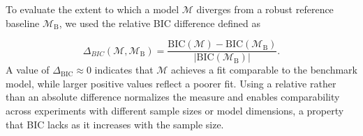 \documentclass[preprint,12pt]{elsarticle}
\newcommand{\blue}{\color{blue}}
\begin{document}


To evaluate the extent to which a model $\mathcal{M}$ diverges from a robust reference baseline $\mathcal{M}_{\text{B}}$, we used 
 the relative BIC difference defined as

\[
\Delta_{BIC}(\mathcal{M} , \mathcal{M}_{\text{B}}) = \frac{\text{BIC}(\mathcal{M}) - \text{BIC}(\mathcal{M}_{\text{B}})}{|\text{BIC}(\mathcal{M}_{\text{B}})|} . 
\] 
A value of \( \Delta_{\mathrm{BIC}} \approx 0 \) indicates that  $\mathcal M$ achieves a fit comparable to the benchmark model, while larger positive values reflect a poorer fit. 
Using a relative rather than an absolute difference normalizes the measure and enables 
comparability across experiments with different sample sizes or model dimensions, a property that BIC lacks as it increases with the sample size.
 
\end{document}
